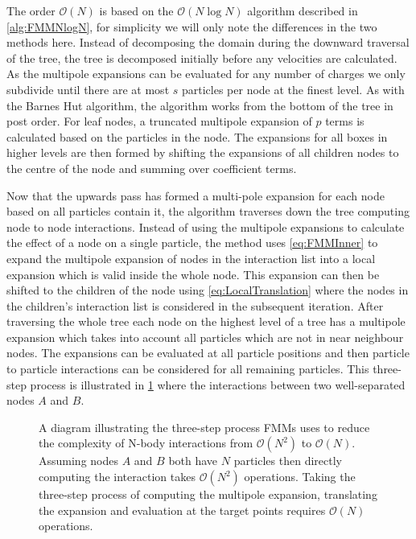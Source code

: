 The order $\mathcal{O}(N)$ is based on the $\mathcal{O}(N\log N)$ algorithm described in \cref{alg:FMMNlogN}, for simplicity we will only note the differences in the two methods here. Instead of decomposing the domain during the downward traversal of the tree, the tree is decomposed initially before any velocities are calculated. As the multipole expansions can be evaluated for any number of charges we only subdivide until there are at most $s$ particles per node at the finest level. As with the Barnes Hut algorithm, the algorithm works from the bottom of the tree in post order. For leaf nodes, a truncated multipole expansion of $p$ terms is calculated based on the particles in the node. The expansions for all boxes in higher levels are then formed by shifting the expansions of all children nodes to the centre of the node and summing over coefficient terms.

Now that the upwards pass has formed a multi-pole expansion for each node based on all particles contain it, the algorithm traverses down the tree computing node to node interactions. Instead of using the multipole expansions to calculate the effect of a node on a single particle, the method uses \cref{eq:FMMInner} to expand the multipole expansion of nodes in the interaction list into a local expansion which is valid inside the whole node. This expansion can then be shifted to the children of the node using \cref{eq:LocalTranslation} where the nodes in the children's interaction list is considered in the subsequent iteration.  After traversing the whole tree each node on the highest level of a tree has a multipole expansion which takes into account all particles which are not in near neighbour nodes. The expansions can  be evaluated at all particle positions and then particle to particle interactions can be considered for all remaining particles. This three-step process is illustrated in \cref{fig:3Step} where the interactions between two well-separated nodes $A$ and $B$.

\begin{figure}
    \centering
        \resizebox{.6\linewidth}{!}{}
    \caption[A diagram illustrating the three-step process FMM uses to reduce the complexity of N-body interactions from $\mathcal{O}(N^2)$ to $\mathcal{O}(N)$.]{A diagram illustrating the three-step process FMMs uses to reduce the complexity of N-body interactions from $\mathcal{O}(N^2)$ to $\mathcal{O}(N)$. Assuming nodes $A$ and $B$ both have $N$ particles then directly computing the interaction takes $\mathcal{O}(N^2)$ operations. Taking the three-step process of computing the multipole expansion, translating the expansion and evaluation at the target points requires $\mathcal{O}(N)$ operations.
    }
    \label{fig:3Step}
\end{figure}


